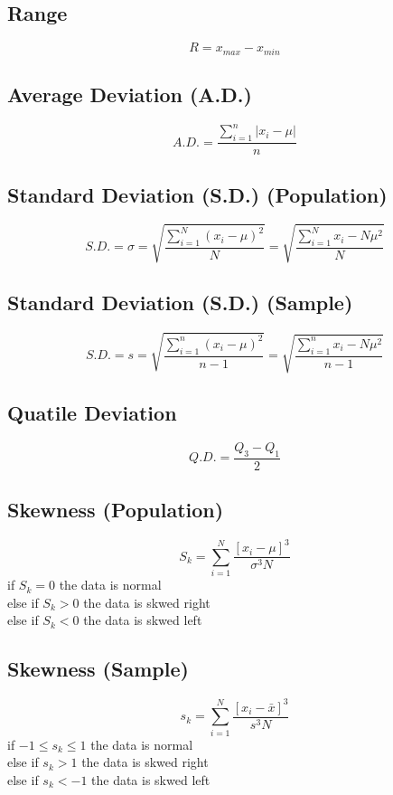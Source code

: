 \documentclass{article}
\begin{document}
    \subsection{Range}
    \begin{equation}
        R = x_{max} - x_{min}
    \end{equation}
    \subsection{Average Deviation (A.D.)}
    \begin{equation}
        A.D. = \frac{\sum_{i=1}^{n} |x_{i}-\mu|}{n}
    \end{equation}
    \subsection{Standard Deviation (S.D.) (Population)}
    \begin{equation}
        S.D. = \sigma = \sqrt{\frac{\sum_{i=1}^{N} (x_{i}-\mu)^2}{N}} = \sqrt{\frac{\sum_{i=1}^{N} x_{i} -N\mu^2}{N}}
    \end{equation}
    \subsection{Standard Deviation (S.D.) (Sample)}
    \begin{equation}
        S.D. = s = \sqrt{\frac{\sum_{i=1}^{n} (x_{i}-\mu)^2}{n-1}} = \sqrt{\frac{\sum_{i=1}^{n} x_{i} -N\mu^2}{n-1}}
    \end{equation}
    \subsection{Quatile Deviation}
    \begin{equation}
        Q.D. = \frac{Q_{3} - Q_{1}}{2}
    \end{equation}
    \subsection{Skewness (Population)}
    \begin{equation}
        S_{k} = \sum_{i=1}^{N}\frac{[x_{i} - \mu]^{3}}{\sigma^{3}N}
    \end{equation}
    if $S_{k} = 0$ the data is normal\\
    else if $S_{k} > 0$ the data is skwed right\\
    else if $S_{k} < 0$ the data is skwed left
    \subsection{Skewness (Sample)}
    \begin{equation}
        s_{k} = \sum_{i=1}^{N}\frac{[x_{i} - \bar{x}]^{3}}{s^{3}N}
    \end{equation}
    if $-1 \leq s_{k} \leq 1$ the data is normal\\
    else if $s_{k} > 1$ the data is skwed right\\
    else if $s_{k} < -1$ the data is skwed left
\end{document}
